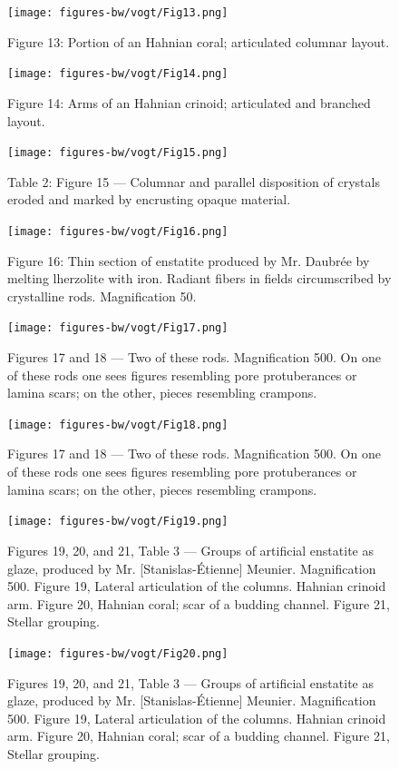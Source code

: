 \documentclass[a4paper, 12pt, oneside]{article}
\begin{document}
\clearpage
\begin{figure}[b]
\centering
\texttt{[image: figures-bw/vogt/Fig13.png]}
\caption{Figure 13: Portion of an Hahnian coral; articulated columnar layout.}
\end{figure}
\clearpage
\begin{figure}[b]
\centering
\texttt{[image: figures-bw/vogt/Fig14.png]}
\caption{Figure 14: Arms of an Hahnian crinoid; articulated and branched layout.}
\end{figure}
\clearpage
\begin{figure}[b]
\centering
\texttt{[image: figures-bw/vogt/Fig15.png]}
\caption{Table 2: Figure 15 --- Columnar and parallel disposition of crystals eroded and marked by encrusting opaque material.}
\end{figure}
\clearpage
{}
\begin{figure}[b]
\texttt{[image: figures-bw/vogt/Fig16.png]}
\caption{Figure 16: Thin section of enstatite produced by Mr. Daubrée by melting lherzolite with iron. Radiant fibers in fields circumscribed by crystalline rods. Magnification 50.}
\centering
\end{figure}
\clearpage
\begin{figure}[b]
\centering
\texttt{[image: figures-bw/vogt/Fig17.png]}
\caption{Figures 17 and 18 --- Two of these rods. Magnification 500. On one of these rods one sees figures resembling pore protuberances or lamina scars; on the other, pieces resembling crampons.}
\end{figure}
\begin{figure}[b]
\centering
\texttt{[image: figures-bw/vogt/Fig18.png]}
\caption{Figures 17 and 18 --- Two of these rods. Magnification 500. On one of these rods one sees figures resembling pore protuberances or lamina scars; on the other, pieces resembling crampons.}
\end{figure}
\clearpage
\begin{figure}[b]
\centering
\texttt{[image: figures-bw/vogt/Fig19.png]}
\caption{Figures 19, 20, and 21, Table 3 --- Groups of artificial enstatite as glaze, produced by Mr. [Stanislas-Étienne] Meunier. Magnification 500. Figure 19, Lateral articulation of the columns. Hahnian crinoid arm. Figure 20, Hahnian coral; scar of a budding channel. Figure 21, Stellar grouping.}
\end{figure}
\clearpage
\begin{figure}[b]
\centering
\texttt{[image: figures-bw/vogt/Fig20.png]}
\caption{Figures 19, 20, and 21, Table 3 --- Groups of artificial enstatite as glaze, produced by Mr. [Stanislas-Étienne] Meunier. Magnification 500. Figure 19, Lateral articulation of the columns. Hahnian crinoid arm. Figure 20, Hahnian coral; scar of a budding channel. Figure 21, Stellar grouping.}
\end{figure}
\end{document}
